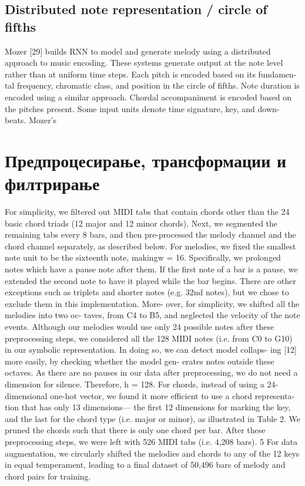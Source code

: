 \subsection{Distributed note representation / circle of fifths}

Mozer [29] builds RNN to model and generate melody using a distributed
approach to music encoding. These systems generate output at the note level rather than at uniform time steps. Each pitch is encoded based on its fundamen- tal frequency, chromatic class, and position in the circle of fifths. Note duration is encoded using a similar approach. Chordal accompaniment is encoded based on the pitches present. Some input units denote time signature, key, and down-
beats. Mozer’s

\section{Предпроцесирање, трансформации и филтрирање}

\cite{Yang2017} 
For simplicity, we filtered out MIDI tabs that contain chords other than the 24 basic chord triads (12 major and 12 minor chords). Next, we segmented the remaining tabs every 8 bars, and then pre-processed the melody channel and the chord channel separately, as described below. For melodies, we fixed the smallest note unit to be the sixteenth note, makingw = 16. Specifically, we prolonged notes which have a pause note after them. If the first note of a bar is a pause, we extended the second note to have it played while the bar begins. There are other exceptions such as triplets and shorter notes (e.g. 32nd notes), but we chose to exclude them in this implementation. More- over, for simplicity, we shifted all the melodies into two oc- taves, from C4 to B5, and neglected the velocity of the note events. Although our melodies would use only 24 possible notes after these preprocessing steps, we considered all the 128 MIDI notes (i.e. from C0 to G10) in our symbolic representation. In doing so, we can detect model collaps- ing [12] more easily, by checking whether the model gen- erates notes outside these octaves. As there are no pauses in our data after preprocessing, we do not need a dimension for silence. Therefore, h = 128. For chords, instead of using a 24-dimensional one-hot vector, we found it more efficient to use a chord representa- tion that has only 13 dimensions— the first 12 dimensions for marking the key, and the last for the chord type (i.e. major or minor), as illustrated in Table 2. We pruned the chords such that there is only one chord per bar. After these preprocessing steps, we were left with 526 MIDI tabs (i.e. 4,208 bars). 5 For data augmentation, we circularly shifted the melodies and chords to any of the 12 keys in equal temperament, leading to a final dataset of 50,496 bars of melody and chord pairs for training.

